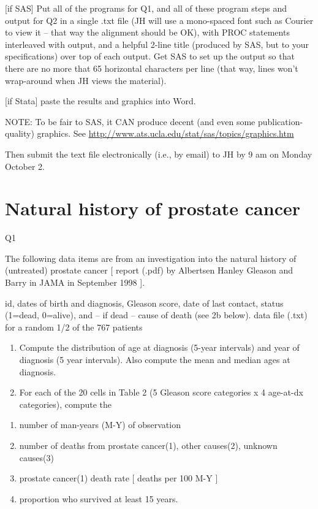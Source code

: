 \documentclass[]{book}
\begin{document}
{[}if SAS{]} Put all of the programs for Q1, and all of these program steps and output for Q2 in a single .txt file (JH will use a mono-spaced font such as Courier to view it -- that way the alignment should be OK), with PROC statements interleaved with output, and a helpful 2-line title (produced by SAS, but to your specifications) over top of each output. Get SAS to set up the output so that there are no more that 65 horizontal characters per line (that way, lines won't wrap-around when JH views the material).

{[}if Stata{]} paste the results and graphics into Word.

NOTE: To be fair to SAS, it CAN produce decent (and even some publication-quality) graphics. See \url{http://www.ats.ucla.edu/stat/sas/topics/graphics.htm}

Then submit the text file electronically (i.e., by email) to JH by 9 am on Monday October 2.

\hypertarget{natural-history-of-prostate-cancer}{%
\section{Natural history of prostate cancer}\label{natural-history-of-prostate-cancer}}

Q1

The following data items are from an investigation into the natural history of (untreated) prostate cancer {[} report (.pdf) by Albertsen Hanley Gleason and Barry in JAMA in September 1998 {]}.

id, dates of birth and diagnosis, Gleason score, date of last contact, status (1=dead, 0=alive), and -- if dead -- cause of death (see 2b below). data file (.txt) for a random 1/2 of the 767 patients

\begin{enumerate}
\def\labelenumi{\arabic{enumi}.}
\item
  Compute the distribution of age at diagnosis (5-year intervals) and year of diagnosis (5 year intervals). Also compute the mean and median ages at diagnosis.
\item
  For each of the 20 cells in Table 2 (5 Gleason score categories x 4 age-at-dx categories), compute the
\end{enumerate}

\begin{enumerate}
\def\labelenumi{\alph{enumi}.}
\item
  number of man-years (M-Y) of observation
\item
  number of deaths from prostate cancer(1), other causes(2), unknown causes(3)
\item
  prostate cancer(1) death rate {[} deaths per 100 M-Y {]}
\item
  proportion who survived at least 15 years.
\end{enumerate}
\end{document}
